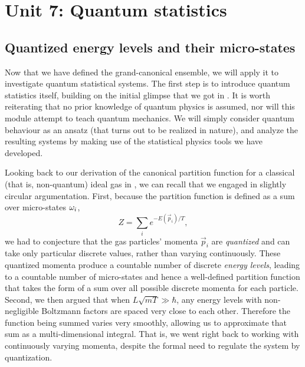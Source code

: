 \renewcommand{\thisunit}{MATH327 Unit 7}
\renewcommand{\moddate}{Last modified 21 Mar.~2023}
\setcounter{section}{7}
\setcounter{subsection}{0}
{}
\section*{Unit 7: Quantum statistics}
\subsection{\label{sec:quantum}Quantized energy levels and their micro-states}
Now that we have defined the grand-canonical ensemble, we will apply it to investigate quantum statistical systems.
The first step is to introduce quantum statistics itself, building on the initial glimpse that we got in .
It is worth reiterating that no prior knowledge of quantum physics is assumed, nor will this module attempt to teach quantum mechanics.
We will simply consider quantum behaviour as an ansatz (that turns out to be realized in nature), and analyze the resulting systems by making use of the statistical physics tools we have developed.

Looking back to our derivation of the canonical partition function for a classical (that is, non-quantum) ideal gas in , we can recall that we engaged in slightly circular argumentation.
First, because the partition function is defined as a sum over micro-states $\omega_i$,
\begin{equation*}
  Z = \sum_i e^{-E(\vec{p}_i) / T},
\end{equation*}
we had to conjecture that the gas particles' momenta $\vec{p}_i$ are \textit{quantized} and can take only particular discrete values, rather than varying continuously.
These quantized momenta produce a countable number of discrete \textit{energy levels}, leading to a countable number of micro-states and hence a well-defined partition function that takes the form of a sum over all possible discrete momenta for each particle.
Second, we then argued that when $L\sqrt{mT} \gg \hbar$, any energy levels with non-negligible Boltzmann factors are spaced very close to each other.
Therefore the function being summed varies very smoothly, allowing us to approximate that sum as a multi-dimensional integral.
That is, we went right back to working with continuously varying momenta, despite the formal need to regulate the system by quantization.

